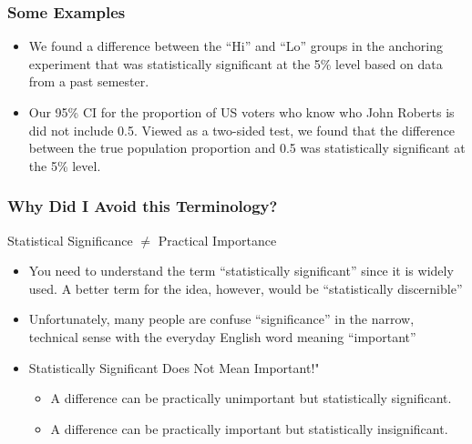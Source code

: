 \documentclass{beamer}
\begin{document}
\begin{frame}
\frametitle{Some Examples}

	\begin{itemize}
		\item We found a difference between the ``Hi'' and ``Lo'' groups in the anchoring experiment that was statistically significant at the 5\% level based on data from a past semester.
		\item Our 95\% CI for the proportion of US voters who know who John Roberts is did not include 0.5. Viewed as a two-sided test, we found that the difference between the true population proportion and 0.5 was statistically significant at the 5\% level.
	\end{itemize}

\end{frame}
\begin{frame}
\frametitle{Why Did I Avoid this Terminology?}
\small
\begin{block}{Statistical Significance $\neq$ Practical Importance}
	\begin{itemize}
		\item You need to understand the term ``statistically significant'' since it is widely used. A better term for the idea, however, would be ``statistically discernible''
		\item Unfortunately, many people are confuse ``significance'' in the narrow, technical sense with the everyday English word meaning ``important'' 
		\item \alert{Statistically Significant Does Not Mean Important!"}
			\begin{itemize}
				\item A difference can be practically unimportant but statistically significant.
				\item A difference can be practically important but statistically insignificant.
			\end{itemize}
	\end{itemize}
\end{block}


\end{frame}
\end{document}
